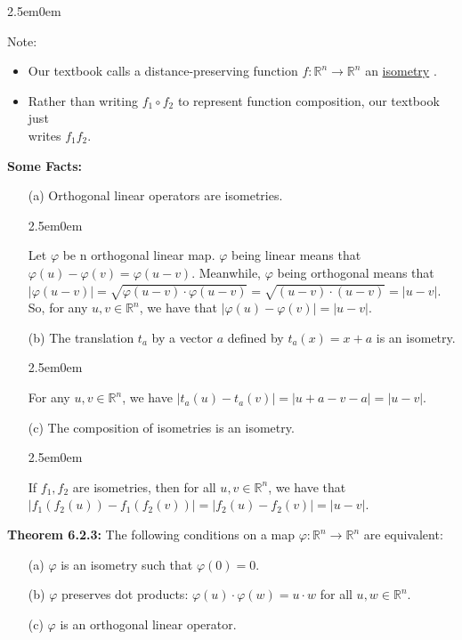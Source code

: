 \documentclass{book}
\newcommand{\hTwo}{%
\color{MidnightBlue}%
   \fontsize{13}{15}\selectfont%
}
\newcommand{\hThree}{%
   \color{PineGreen!85!Orange}
   \fontsize{12}{14}\selectfont%
}
\newcommand{\myComment}{%
   \color{RawerSienna}%
   \fontsize{12}{14}\selectfont%
}
\newenvironment{myIndent}{%
   \begin{adjustwidth}{2.5em}{0em}%
}{%
   \end{adjustwidth}%
}
\newcommand{\udefine}[1]{{%
   \setulcolor{Red}%
   \setul{0.14em}{0.07em}%
   \ul{#1}%
}}
\newcommand{\blab}[1]{\textbf{#1}}
\newcommand{\retTwo}{\hfill\bigbreak}
\begin{document}
\begin{myIndent}\myComment
	Note:\\ [-18pt]
	\begin{itemize}
		\item Our textbook calls a distance-preserving function $f: \mathbb{R}^n \longrightarrow \mathbb{R}^n$ an \udefine{isometry}.
		\item Rather than writing $f_1 \circ f_2$ to represent function composition, our textbook just\\ writes $f_1f_2$.\newpage
	\end{itemize}

	\hTwo
	\blab{Some Facts:}
	\begin{itemize}
		\item[(a)] Orthogonal linear operators are isometries.
		
		\begin{myIndent}\hThree
			Let $\varphi$ be n orthogonal linear map. $\varphi$ being linear means that\\ $\varphi(u) - \varphi(v) = \varphi(u - v)$. Meanwhile, $\varphi$ being orthogonal means that\\ $|\varphi(u - v)| = \sqrt{\varphi(u - v) \cdot \varphi(u -v)} = \sqrt{(u - v) \cdot (u - v)} = |u - v|$.\\ So, for any $u, v \in \mathbb{R}^n$, we have that $|\varphi(u) - \varphi(v)| = |u - v|$.\retTwo
		\end{myIndent}

		\item[(b)] The translation $t_a$ by a vector $a$ defined by $t_a(x) = x + a$ is an isometry.
		\begin{myIndent}\hThree
			For any $u, v \in \mathbb{R}^n$, we have $|t_a(u) - t_a(v)| = |u + a - v - a| = |u - v|$.\retTwo
		\end{myIndent}

		\item[(c)] The composition of isometries is an isometry.
		\begin{myIndent}\hThree
			If $f_1, f_2$ are isometries, then for all $u, v \in \mathbb{R}^n$, we have that\\ $|f_1(f_2(u)) - f_1(f_2(v))| = |f_2(u) - f_2(v)| = |u - v|$.\retTwo
		\end{myIndent}
	\end{itemize}

	\blab{Theorem 6.2.3:} The following conditions on a map $\varphi: \mathbb{R}^n \longrightarrow \mathbb{R}^n$ are equivalent:
	\begin{itemize}
		\item[(a)] $\varphi$ is an isometry such that $\varphi(0) = 0$.
		\item[(b)] $\varphi$ preserves dot products: $\varphi(u) \cdot \varphi(w) = u \cdot w$ for all $u, w \in \mathbb{R}^n$.
		\item[(c)] $\varphi$ is an orthogonal linear operator.
		

\end{itemize}
\end{myIndent}
\end{document}
